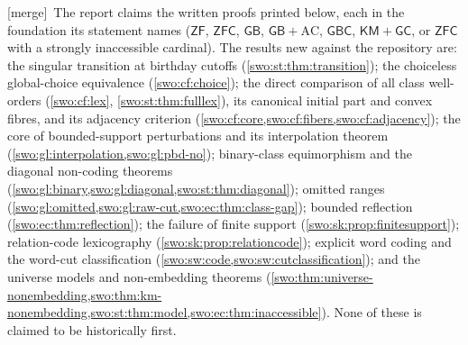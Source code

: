 \documentclass[11pt]{article}
\theoremstyle{definition}
\theoremstyle{remark}
\newcommand{\GB}{\mathsf{GB}}
\newcommand{\GBC}{\mathsf{GBC}}
\newcommand{\ZFC}{\mathsf{ZFC}}
\newcommand{\ZF}{\mathsf{ZF}}
\newcommand{\KM}{\mathsf{KM}}
\newcommand{\GC}{\mathsf{GC}}
\newcommand{\merge}{\textsf{[merge]}}
\begin{document}
\merge\ The report claims the written proofs printed below, each in the
foundation its statement names ($\ZF$, $\ZFC$, $\GB$, $\GB+\mathrm{AC}$,
$\GBC$, $\KM+\GC$, or $\ZFC$ with a strongly inaccessible cardinal). The
results new against the repository are: the singular transition at birthday
cutoffs (\cref{swo:st:thm:transition}); the choiceless global-choice
equivalence (\cref{swo:cf:choice}); the direct comparison of all class
well-orders (\cref{swo:cf:lex}, \cref{swo:st:thm:fulllex}), its canonical
initial part and convex fibres, and its adjacency criterion
(\cref{swo:cf:core,swo:cf:fibers,swo:cf:adjacency}); the core of
bounded-support perturbations and its interpolation theorem
(\cref{swo:gl:interpolation,swo:gl:pbd-no}); binary-class equimorphism and
the diagonal non-coding theorems (\cref{swo:gl:binary,swo:gl:diagonal,swo:st:thm:diagonal});
omitted ranges (\cref{swo:gl:omitted,swo:gl:raw-cut,swo:ec:thm:class-gap});
bounded reflection (\cref{swo:ec:thm:reflection}); the failure of finite
support (\cref{swo:sk:prop:finitesupport}); relation-code lexicography
(\cref{swo:sk:prop:relationcode}); explicit word coding and the word-cut
classification (\cref{swo:sw:code,swo:sw:cutclassification}); and the
universe models and non-embedding theorems
(\cref{swo:thm:universe-nonembedding,swo:thm:km-nonembedding,swo:st:thm:model,swo:ec:thm:inaccessible}).
None of these is claimed to be historically first.
\end{document}
